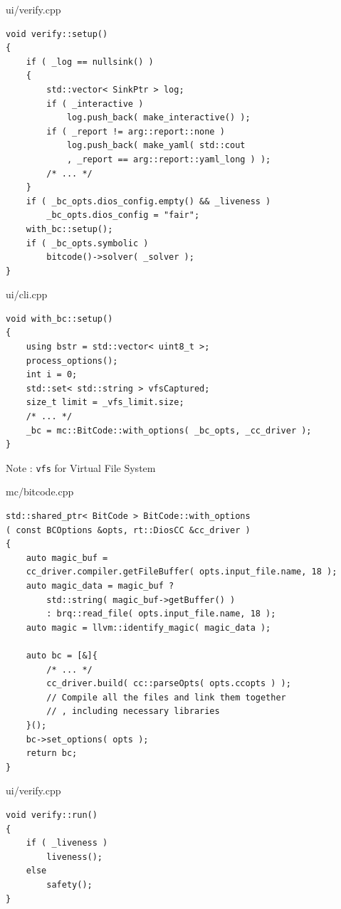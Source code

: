\documentclass[12pt]{beamer}
\newcommand{\code}[1]{\texttt{#1}}
\begin{document}

\begin{frame}[fragile]{ui/verify.cpp}
\begin{lstlisting}[basicstyle=\footnotesize\ttfamily]
void verify::setup()
{
    if ( _log == nullsink() )
    {
        std::vector< SinkPtr > log;
        if ( _interactive )
            log.push_back( make_interactive() );
        if ( _report != arg::report::none )
            log.push_back( make_yaml( std::cout
            , _report == arg::report::yaml_long ) );
        /* ... */
    }
    if ( _bc_opts.dios_config.empty() && _liveness )
        _bc_opts.dios_config = "fair";
    with_bc::setup();
    if ( _bc_opts.symbolic )
        bitcode()->solver( _solver );
}
\end{lstlisting}
\end{frame}

\begin{frame}[fragile]{ui/cli.cpp}
\begin{lstlisting}[basicstyle=\footnotesize\ttfamily]
void with_bc::setup()
{
    using bstr = std::vector< uint8_t >;
    process_options();
    int i = 0;
    std::set< std::string > vfsCaptured;
    size_t limit = _vfs_limit.size;
    /* ... */
    _bc = mc::BitCode::with_options( _bc_opts, _cc_driver );
}
\end{lstlisting}
Note : \code{vfs} for Virtual File System
\end{frame}

\begin{frame}[fragile]{mc/bitcode.cpp}
\begin{lstlisting}[basicstyle=\footnotesize\ttfamily]
std::shared_ptr< BitCode > BitCode::with_options
( const BCOptions &opts, rt::DiosCC &cc_driver )
{
    auto magic_buf = 
    cc_driver.compiler.getFileBuffer( opts.input_file.name, 18 );
    auto magic_data = magic_buf ?
        std::string( magic_buf->getBuffer() )
        : brq::read_file( opts.input_file.name, 18 );
    auto magic = llvm::identify_magic( magic_data );
    
    auto bc = [&]{
        /* ... */
        cc_driver.build( cc::parseOpts( opts.ccopts ) );
        // Compile all the files and link them together
        // , including necessary libraries
    }();
    bc->set_options( opts );
    return bc;
}
\end{lstlisting}
\end{frame}


\begin{frame}[fragile, label=safety_liveness]{ui/verify.cpp}
\begin{lstlisting}[basicstyle=\normalsize\ttfamily]
void verify::run()
{
    if ( _liveness )
        liveness();
    else
        safety();
}
\end{lstlisting}
\end{frame}
\end{document}
